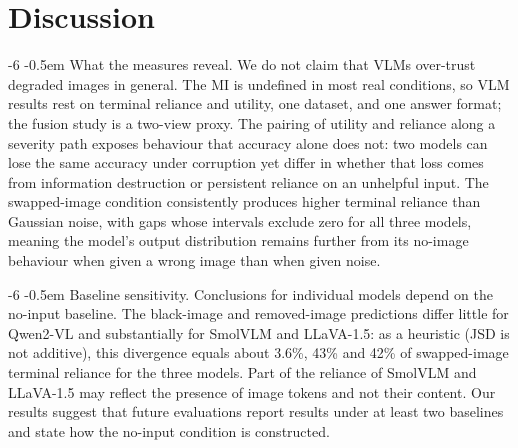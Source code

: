 \documentclass[graybox]{svmult}
\makeatletter
\newcommand{\checknum}[2]{#1}
\renewcommand\paragraph{\@startsection{paragraph}{4}{\z@}%
  {-6\p@ \@plus -2\p@ \@minus -2\p@}%
  {-0.5em}%
  {\normalfont\normalsize\bfseries}}
\makeatother
\begin{document}
\section{Discussion}
\label{sec:discussion}

\paragraph{What the measures reveal.}
We do not claim that VLMs over-trust degraded images in general. The MI is
undefined in most real conditions, so VLM results rest on terminal
reliance and utility, one dataset, and one answer format; the fusion study
is a two-view proxy. The pairing of utility and reliance along a severity
path exposes behaviour that accuracy alone does not: two models can lose the
same accuracy under corruption yet differ in whether that loss comes from
information destruction or persistent reliance on an unhelpful input.
The swapped-image condition consistently produces higher terminal reliance
than Gaussian noise, with gaps whose intervals exclude zero for all three
models, meaning the model's output distribution remains further from its
no-image behaviour when given a wrong image than when given noise.

\paragraph{Baseline sensitivity.}
Conclusions for individual models depend on the no-input baseline. The
black-image and removed-image predictions differ little for Qwen2-VL and
substantially for SmolVLM and LLaVA-1.5: as a heuristic (JSD is not
additive), this divergence equals about
\checknum{3.6}{floor:Qwen2-VL-2B-Instruct:floor_pct}\%,
\checknum{43}{floor:SmolVLM-Instruct:floor_pct}\% and
\checknum{42}{floor:llava-1.5-7b-hf:floor_pct}\% of swapped-image terminal
reliance for the three models. Part of the reliance of SmolVLM and
LLaVA-1.5 may reflect the presence of image tokens and not their content.
Our results suggest that future evaluations report results under at least two
baselines and state how the no-input condition is constructed.

\end{document}
